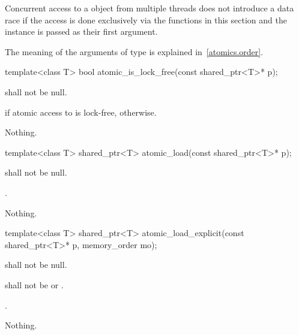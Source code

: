 \pnum
Concurrent access to a  object from multiple threads does not
introduce a data race if the access is done exclusively via the functions in
this section and the instance is passed as their first argument.

\pnum
The meaning of the arguments of type  is explained in~\ref{atomics.order}.

%
%
\begin{itemdecl}
template<class T>
  bool atomic_is_lock_free(const shared_ptr<T>* p);
\end{itemdecl}

\begin{itemdescr}
\pnum
\requires {} shall not be null.

\pnum
\returns {} if atomic access to  is lock-free,  otherwise.

\pnum
\throws Nothing.
\end{itemdescr}

%
%
\begin{itemdecl}
template<class T>
  shared_ptr<T> atomic_load(const shared_ptr<T>* p);
\end{itemdecl}

\begin{itemdescr}
\pnum
\requires {} shall not be null.

\pnum
\returns {}.

\pnum
\throws Nothing.
\end{itemdescr}

%
%
\begin{itemdecl}
template<class T>
  shared_ptr<T> atomic_load_explicit(const shared_ptr<T>* p, memory_order mo);
\end{itemdecl}

\begin{itemdescr}
\pnum
\requires {} shall not be null.

\pnum
\requires {} shall not be  or .

\pnum
\returns {}.

\pnum
\throws Nothing.
\end{itemdescr}

